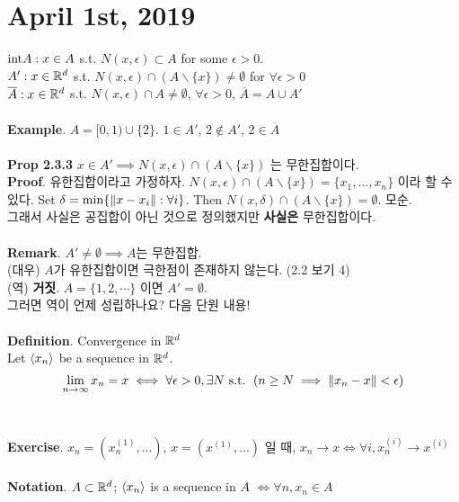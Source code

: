 \section*{April 1st, 2019}
$ \mathrm{int} A : x\in A$ s.t. $N(x, \epsilon) \subset A$ for some $\epsilon > 0$.\\
$A': x\in \mathbb{R}^d$ s.t. $N(x, \epsilon) \cap (A\backslash\{x\})\neq \emptyset$ for $\forall \epsilon >0$\\
$\overline{A}: x\in \mathbb{R}^d$ s.t. $N(x, \epsilon) \cap A\neq\emptyset$, $\forall \epsilon>0$, $\overline{A} = A\cup A'$\\
\\
\textbf{Example}. $A=[0, 1)\cup \{2\}$. $ 1\in A' $, $ 2\notin A' $, $ 2\in \overline{A} $\\
\\
\textbf{Prop 2.3.3} $ x\in A' \implies N(x, \epsilon)\cap (A\backslash \{x\})$ 는 무한집합이다.\\
\textbf{Proof}. 유한집합이라고 가정하자. $N(x, \epsilon) \cap (A\backslash \{x\}) = \{x_1, \dots, x_n\}$ 이라 할 수 있다.
Set $\delta = \min\{\left\lVert x-x_i\right\rVert: \forall i\}$. Then $ N(x, \delta) \cap (A\backslash \{x\})=\emptyset $. 모순.\\
그래서 사실은 공집합이 아닌 것으로 정의했지만 \textbf{사실은} 무한집합이다.\\
\\
\textbf{Remark}. $A'\neq\emptyset\implies A$는 무한집합.\\
(대우) $A$가 유한집합이면 극한점이 존재하지 않는다. (2.2 보기 4)\\
(역) \textbf{거짓}. $A = \{1, 2, \cdots\}$ 이면 $A'=\emptyset$.\\
그러면 역이 언제 성립하나요? 다음 단원 내용!\\
\\
\textbf{Definition}. Convergence in $\mathbb{R}^d$\\
Let $\left\langle x_n \right\rangle$ be a sequence in $\mathbb{R}^d$. $$\lim_{n\rightarrow \infty} x_n= x \iff \forall \epsilon>0, \exists N \text{ s.t. } \left (n\geq N \implies \left\lVert x_n-x\right\rVert<\epsilon\right )$$\\
\\
\textbf{Exercise}. $x_n = (x_n^{(1)}, \dots)$, $x = (x^{(1)}, \dots)$ 일 때, $x_n\rightarrow x \iff \forall i, x_n^{(i)} \rightarrow x^{(i)} $\\
\\
\textbf{Notation}. $A\subset \mathbb{R}^d$; $\left\langle x_n \right\rangle$ is a sequence in $A$ $\iff \forall n, x_n\in A $\\
\\

